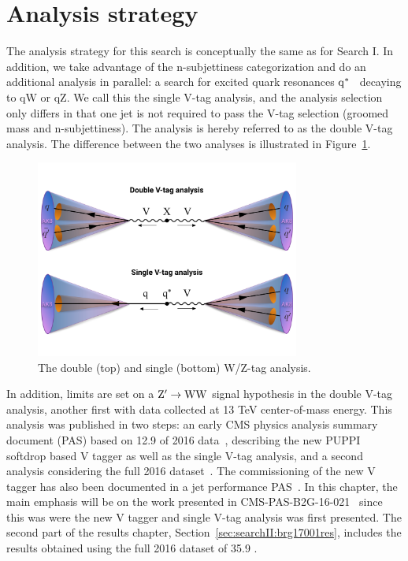 \section{Analysis strategy}
The analysis strategy for this search is conceptually the same as for Search I. In addition, we take advantage of the n-subjettiness categorization and do an additional analysis in parallel: a search for excited quark resonances $\rm{q^*}$~\cite{Bauer1987,PhysRevD.42.815} decaying to qW or qZ.
We call this the single V-tag analysis, and the analysis selection only differs in that one jet is not required to pass the V-tag selection (groomed mass and n-subjettiness). The \VV analysis is hereby referred to as the double V-tag analysis. The difference between the two analyses is illustrated in Figure~\ref{fig:searchII:svsd}. 
\begin{figure}[h!]
\centering
\includegraphics[height=6.5cm]{figures/analysis/search2/misc/singlevsdoubletag.pdf}
\caption{The double (top) and single (bottom) W/Z-tag analysis.}
\label{fig:searchII:svsd}
\end{figure}
In addition, limits are set on a $\mathrm{Z}^\prime \rightarrow \mathrm{W}\mathrm{W}$ signal hypothesis in the double V-tag analysis, another first with data collected at 13 TeV center-of-mass energy.
This analysis was published in two steps: an early CMS physics analysis summary document (PAS) based on 12.9 \fbinv of 2016 data~\cite{CMS-PAS-B2G-16-021}, describing the new PUPPI softdrop based V tagger as well as the single V-tag analysis, and a second analysis considering the full 2016 dataset~\cite{PhysRevD.97.072006}. The commissioning of the new V tagger has also been documented in a jet performance PAS~\cite{CMS-PAS-JME-16-003}. In this chapter, the main emphasis will be on the work presented in CMS-PAS-B2G-16-021~\cite{CMS-PAS-B2G-16-021} since this was were the new V tagger and single V-tag analysis was first presented. The second part of the results chapter, Section~\ref{sec:searchII:brg17001res}, includes the results obtained using the full 2016 dataset of 35.9 \fbinv.

